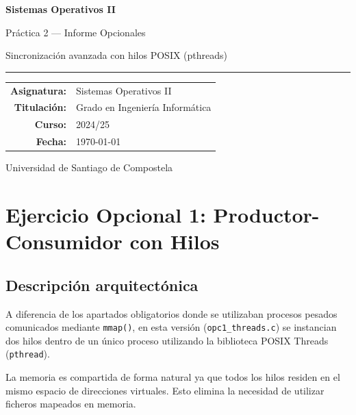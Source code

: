 \documentclass[a4paper, 12pt]{article}
\newcommand{\ic}[1]{\texttt{#1}}
\begin{document}
\begin{titlepage}
  \centering
  \vspace*{3cm}
  {\Huge\bfseries\color{azul} Sistemas Operativos II\par}
  \vspace{0.6cm}
  {\LARGE Práctica 2 --- Informe Opcionales\par}
  \vspace{0.4cm}
  {\large\color{gray} Sincronización avanzada con hilos POSIX (pthreads)\par}
  \vspace{0.5cm}
  \textcolor{azul}{\rule{0.7\linewidth}{1.2pt}}
  \vspace{2cm}

  \begin{tabular}{rl}
    \textbf{Asignatura:} & Sistemas Operativos II \\[4pt]
    \textbf{Titulación:} & Grado en Ingeniería Informática \\[4pt]
    \textbf{Curso:}      & 2024/25 \\[4pt]
    \textbf{Fecha:}      & \today \\
  \end{tabular}

  \vfill
  {\small Universidad de Santiago de Compostela}
\end{titlepage}

\tableofcontents
\newpage

\section{Ejercicio Opcional 1: Productor-Consumidor con Hilos}

\subsection{Descripción arquitectónica}

A diferencia de los apartados obligatorios donde se utilizaban procesos pesados comunicados mediante \ic{mmap()}, en esta versión (\ic{opc1\_threads.c}) se instancian dos hilos dentro de un único proceso utilizando la biblioteca POSIX Threads (\ic{pthread}).

La memoria es compartida de forma natural ya que todos los hilos residen en el mismo espacio de direcciones virtuales. Esto elimina la necesidad de utilizar ficheros mapeados en memoria.
\end{document}
